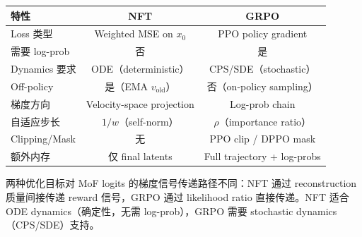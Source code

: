 \documentclass[11pt,a4paper]{article}
\theoremstyle{definition}
\begin{document}
\begin{center}
\renewcommand{\arraystretch}{1.4}
\begin{tabular}{lcc}
\toprule
\textbf{特性} & \textbf{NFT} & \textbf{GRPO} \\
\midrule
Loss 类型 & Weighted MSE on $x_0$ & PPO policy gradient \\
需要 log-prob & 否 & 是 \\
Dynamics 要求 & ODE（deterministic） & CPS/SDE（stochastic） \\
Off-policy & 是（EMA $v_{\mathrm{old}}$） & 否（on-policy sampling） \\
梯度方向 & Velocity-space projection & Log-prob chain \\
自适应步长 & $1/w$（self-norm） & $\rho$（importance ratio） \\
Clipping/Mask & 无 & PPO clip / DPPO mask \\
额外内存 & 仅 final latents & Full trajectory + log-probs \\
\bottomrule
\end{tabular}
\end{center}

两种优化目标对 MoF logits 的梯度信号传递路径不同：NFT 通过 reconstruction 质量间接传递 reward 信号，GRPO 通过 likelihood ratio 直接传递。NFT 适合 ODE dynamics（确定性，无需 log-prob），GRPO 需要 stochastic dynamics（CPS/SDE）支持。
\end{document}
